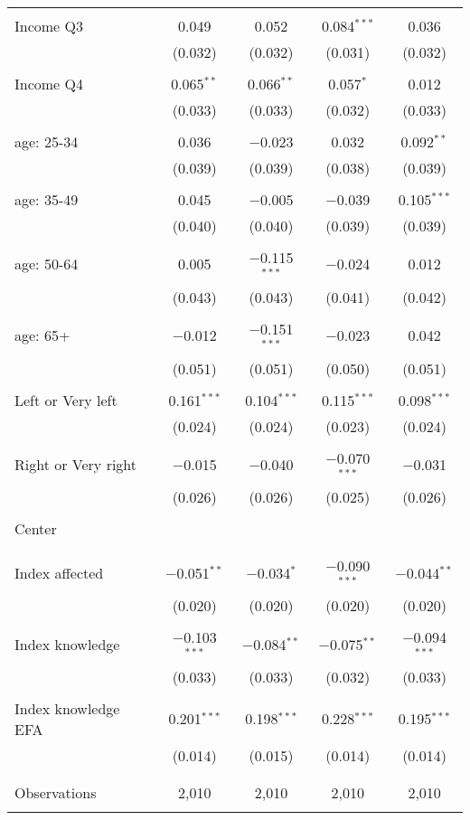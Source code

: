 \begin{tabular}{@{\extracolsep{5pt}}lcccc}
  & & & & \\ 
 Income Q3 & 0.049 & 0.052 & 0.084$^{***}$ & 0.036 \\ 
  & (0.032) & (0.032) & (0.031) & (0.032) \\ 
  & & & & \\ 
 Income Q4 & 0.065$^{**}$ & 0.066$^{**}$ & 0.057$^{*}$ & 0.012 \\ 
  & (0.033) & (0.033) & (0.032) & (0.033) \\ 
  & & & & \\ 
 age: 25-34 & 0.036 & $-$0.023 & 0.032 & 0.092$^{**}$ \\ 
  & (0.039) & (0.039) & (0.038) & (0.039) \\ 
  & & & & \\ 
 age: 35-49 & 0.045 & $-$0.005 & $-$0.039 & 0.105$^{***}$ \\ 
  & (0.040) & (0.040) & (0.039) & (0.039) \\ 
  & & & & \\ 
 age: 50-64 & 0.005 & $-$0.115$^{***}$ & $-$0.024 & 0.012 \\ 
  & (0.043) & (0.043) & (0.041) & (0.042) \\ 
  & & & & \\ 
 age: 65+ & $-$0.012 & $-$0.151$^{***}$ & $-$0.023 & 0.042 \\ 
  & (0.051) & (0.051) & (0.050) & (0.051) \\ 
  & & & & \\ 
 Left or Very left & 0.161$^{***}$ & 0.104$^{***}$ & 0.115$^{***}$ & 0.098$^{***}$ \\ 
  & (0.024) & (0.024) & (0.023) & (0.024) \\ 
  & & & & \\ 
 Right or Very right & $-$0.015 & $-$0.040 & $-$0.070$^{***}$ & $-$0.031 \\ 
  & (0.026) & (0.026) & (0.025) & (0.026) \\ 
  & & & & \\ 
 Center &  &  &  &  \\ 
  &  &  &  &  \\ 
  & & & & \\ 
 Index affected & $-$0.051$^{**}$ & $-$0.034$^{*}$ & $-$0.090$^{***}$ & $-$0.044$^{**}$ \\ 
  & (0.020) & (0.020) & (0.020) & (0.020) \\ 
  & & & & \\ 
 Index knowledge & $-$0.103$^{***}$ & $-$0.084$^{**}$ & $-$0.075$^{**}$ & $-$0.094$^{***}$ \\ 
  & (0.033) & (0.033) & (0.032) & (0.033) \\ 
  & & & & \\ 
 Index knowledge EFA & 0.201$^{***}$ & 0.198$^{***}$ & 0.228$^{***}$ & 0.195$^{***}$ \\ 
  & (0.014) & (0.015) & (0.014) & (0.014) \\ 
  & & & & \\ 
\hline \\[-1.8ex] 

Observations & 2,010 & 2,010 & 2,010 & 2,010 \\ 
\hline 
\hline \\[-1.8ex] 
\end{tabular} 